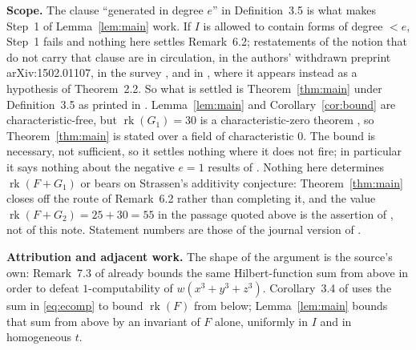 \documentclass[11pt]{amsart}
\theoremstyle{remark}
\theoremstyle{definition}
\DeclareMathOperator{\rk}{rk}
\begin{document}
\medskip
\noindent\textbf{Scope.} The clause ``generated in degree $e$'' in Definition~3.5 is what makes
Step~1 of Lemma~\ref{lem:main} work. If $I$ is allowed to contain forms of degree $<e$, Step~1
fails and nothing here settles Remark~6.2; restatements of the notion that do not carry that
clause are in circulation, in the authors' withdrawn preprint arXiv:1502.01107, in the survey
\cite{HG}, and in \cite{BCDM}, where it appears instead as a hypothesis of Theorem~2.2. So what
is settled is Theorem~\ref{thm:main} under Definition~3.5 as printed in \cite{CCCGW}. Lemma~\ref{lem:main} and
Corollary~\ref{cor:bound} are characteristic-free, but $\rk(G_1)=30$ is a characteristic-zero
theorem \cite{CCG}, so Theorem~\ref{thm:main} is stated over a field of characteristic $0$. The
bound is necessary, not sufficient, so it settles nothing where it does not fire; in particular
it says nothing about the negative $e=1$ results of \cite{CCCGW}. Nothing here determines
$\rk(F+G_1)$ or bears on Strassen's additivity conjecture: Theorem~\ref{thm:main} closes off the
route of Remark~6.2 rather than completing it, and the value $\rk(F+G_2)=25+30=55$ in the
passage quoted above is the assertion of \cite{CCCGW}, not of this note. Statement numbers are
those of the journal version of \cite{CCCGW}.

\medskip
\noindent\textbf{Attribution and adjacent work.} The shape of the argument is the source's own:
Remark~7.3 of \cite{CCCGW} already bounds the same Hilbert-function sum from above in order to
defeat $1$-computability of $w(x^3+y^3+z^3)$. Corollary~3.4 of \cite{CCCGW} uses the sum in
\eqref{eq:ecomp} to bound $\rk(F)$ from below; Lemma~\ref{lem:main} bounds that sum from above by
an invariant of $F$ alone, uniformly in $I$ and in homogeneous $t$.
\end{document}
